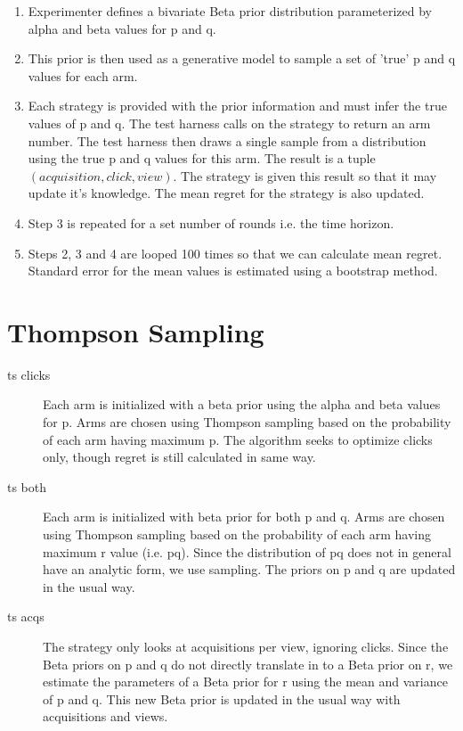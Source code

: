\documentclass[11pt,a4,singlespacing,titlepagenumber=on]{scrreprt}
\numberwithin{equation}{chapter} %
\theoremstyle{remark}
\begin{document}
\begin{enumerate}
	\item Experimenter defines a bivariate Beta prior distribution parameterized by alpha and beta values for p and q.
	\item This prior is then used as a generative model to sample a set of 'true' p and q values for each arm.
	\item Each strategy is provided with the prior information and must infer the true values of p and q. The test harness calls on the strategy to return an arm number. The test harness then draws a single sample from a distribution using the true p and q values for this arm. The result is a tuple $(acquisition,click,view)$. The strategy is given this result so that it may update it's knowledge. The mean regret for the strategy is also updated.
	\item Step 3 is repeated for a set number of rounds i.e. the time horizon.
	\item Steps 2, 3 and 4 are looped 100 times so that we can calculate mean regret. Standard error for the mean values is estimated using a bootstrap method.
\end{enumerate}





\section{Thompson Sampling}

\begin{description}
	\item[ts clicks] Each arm is initialized with a beta prior using the alpha and beta values for p. Arms are chosen using Thompson sampling based on the probability of each arm having maximum p. The algorithm seeks to optimize clicks only, though regret is still calculated in same way.
	\item[ts both] Each arm is initialized with beta prior for both p and q. Arms are chosen using Thompson sampling based on the probability of each arm having maximum r value (i.e. pq). Since the distribution of pq does not in general have an analytic form, we use sampling. The priors on p and q are updated in the usual way.
	\item[ts acqs] The strategy only looks at acquisitions per view, ignoring clicks. Since the Beta priors on p and q do not directly translate in to a Beta prior on r, we estimate the parameters of a Beta prior for r using the mean and variance of p and q. This new Beta prior is updated in the usual way with acquisitions and views.
\end{description}
\end{document}
